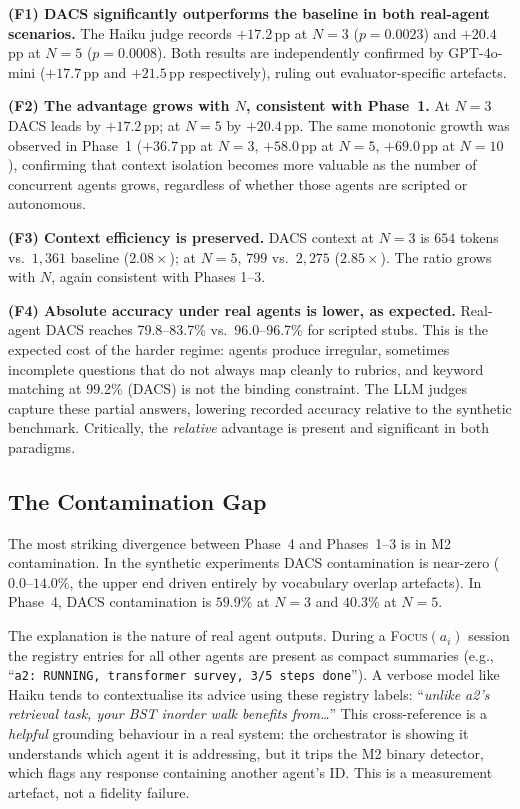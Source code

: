 \documentclass{article}
\begin{document}
\noindent\textbf{(F1) DACS significantly outperforms the baseline in
both real-agent scenarios.}
The Haiku judge records $+17.2$\,pp at $N{=}3$ ($p{=}0.0023$) and
$+20.4$\,pp at $N{=}5$ ($p{=}0.0008$).
Both results are independently confirmed by GPT-4o-mini ($+17.7$\,pp and
$+21.5$\,pp respectively), ruling out evaluator-specific artefacts.

\noindent\textbf{(F2) The advantage grows with $N$, consistent with
Phase~1.}
At $N{=}3$ DACS leads by $+17.2$\,pp; at $N{=}5$ by $+20.4$\,pp.
The same monotonic growth was observed in Phase~1
($+36.7$\,pp at $N{=}3$, $+58.0$\,pp at $N{=}5$, $+69.0$\,pp at
$N{=}10$), confirming that context isolation becomes more valuable
as the number of concurrent agents grows, regardless of whether those
agents are scripted or autonomous.

\noindent\textbf{(F3) Context efficiency is preserved.}
DACS context at $N{=}3$ is $654$ tokens vs.\ $1{,}361$ baseline
($2.08\times$); at $N{=}5$, $799$ vs.\ $2{,}275$ ($2.85\times$).
The ratio grows with $N$, again consistent with Phases 1--3.

\noindent\textbf{(F4) Absolute accuracy under real agents is lower,
as expected.}
Real-agent DACS reaches 79.8--83.7\% vs.\ 96.0--96.7\% for scripted
stubs.
This is the expected cost of the harder regime: agents produce irregular,
sometimes incomplete questions that do not always map cleanly to rubrics,
and keyword matching at 99.2\% (DACS) is not the binding constraint.
The LLM judges capture these partial answers, lowering recorded accuracy
relative to the synthetic benchmark.
Critically, the \emph{relative} advantage is present and significant in
both paradigms.

\subsection{The Contamination Gap}
\label{sec:contam_gap}

The most striking divergence between Phase~4 and Phases~1--3 is in M2
contamination.
In the synthetic experiments DACS contamination is near-zero
($0.0$--$14.0\%$, the upper end driven entirely by vocabulary overlap
artefacts).
In Phase~4, DACS contamination is $59.9\%$ at $N{=}3$ and $40.3\%$ at
$N{=}5$.

The explanation is the nature of real agent outputs.
During a \textsc{Focus}$(a_i)$ session the registry entries for all other
agents are present as compact summaries (e.g.,
``\texttt{a2: RUNNING, transformer survey, 3/5 steps done}'').
A verbose model like Haiku tends to contextualise its advice using these
registry labels: ``\emph{unlike a2's retrieval task, your BST inorder walk
benefits from\ldots}''
This cross-reference is a \emph{helpful} grounding behaviour in a real
system: the orchestrator is showing it understands which agent it is
addressing, but it trips the M2 binary detector, which flags any response
containing another agent's ID.
This is a measurement artefact, not a fidelity failure.
\end{document}
